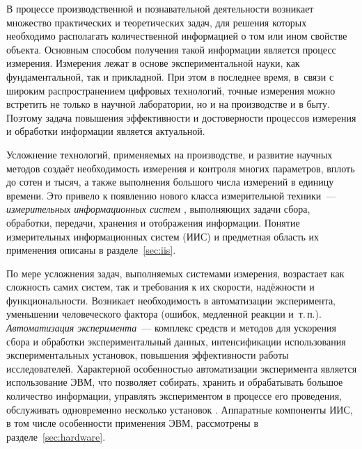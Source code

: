 \documentclass[a4paper, 14pt, titlepage]{extarticle}
\newcommand{\term}[1]{\emph{#1}}
\begin{document}
  В процессе производственной и познавательной деятельности возникает множество практических и
  теоретических задач, для решения которых необходимо располагать количественной информацией о том
  или ином свойстве объекта. Основным способом получения такой информации является процесс измерения.
  Измерения лежат в основе экспериментальной науки, как фундаментальной, так и прикладной. При этом
  в последнее время, в~связи с широким распространением цифровых технологий, точные измерения можно
  встретить не только в научной лаборатории, но и на производстве и в быту.
  Поэтому задача повышения эффективности и достоверности процессов измерения и обработки информации
  является актуальной.

  Усложнение технологий, применяемых на производстве, и развитие научных методов создаёт
  необходимость измерения и контроля многих параметров, вплоть до сотен и тысяч, а также
  выполнения большого числа измерений в единицу времени. Это привело к появлению нового класса
  измерительной техники~--- \term{измерительных информационных систем} \cite{rannev-iis,rannev-meas-tech},
  выполняющих задачи сбора, обработки, передачи, хранения и отображения информации.
  Понятие измерительных информационных систем (ИИС) и предметная область их применения описаны в
  разделе~\ref{sec:iis}.

  По мере усложнения задач, выполняемых системами измерения, возрастает как сложность самих систем,
  так и требования к их скорости, надёжности и функциональности. Возникает необходимость в
  автоматизации эксперимента, уменьшении человеческого фактора (ошибок, медленной реакции и~т.\,п.).
  \term{Автоматизация эксперимента}~--- комплекс
  средств и методов для ускорения сбора и обработки экспериментальный данных, интенсификации
  использования экспериментальных установок, повышения эффективности работы исследователей.
  Характерной особенностью автоматизации эксперимента является использование ЭВМ, что позволяет
  собирать, хранить и обрабатывать большое количество информации, управлять экспериментом в процессе
  его проведения, обслуживать одновременно несколько установок \cite{petronevich-automation,sokolov-auto-measure}.
  Аппаратные компоненты ИИС, в том числе особенности применения ЭВМ, рассмотрены в
  разделе~\ref{sec:hardware}.
\end{document}
